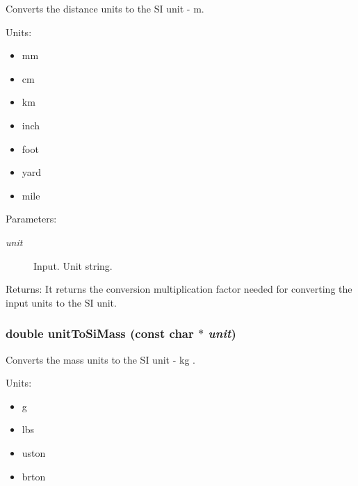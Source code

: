 Converts the distance units to the SI unit - m. 

Units:\begin{itemize}
\item mm\item cm\item km\item inch\item foot\item yard\item mile\end{itemize}


\begin{Desc}
\item[Parameters:]
\begin{description}
\item[{\em unit}]Input. Unit string.\end{description}
\end{Desc}
\begin{Desc}
\item[Returns:]It returns the conversion multiplication factor needed for converting the input units to the SI unit. \end{Desc}
\hypertarget{group__unit__conv_g8d02fac0f3c4ac8a798e30cc6a747904}{
\subsubsection[unitToSiMass]{\setlength{\rightskip}{0pt plus 5cm}double unitToSiMass (const char $\ast$ {\em unit})}}
\label{group__unit__conv_g8d02fac0f3c4ac8a798e30cc6a747904}


Converts the mass units to the SI unit - kg . 

Units:\begin{itemize}
\item g\item lbs\item uston\item brton\end{itemize}



